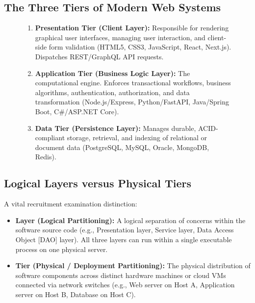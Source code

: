 \subsection{The Three Tiers of Modern Web Systems}
\begin{figure}[htbp]
\centering
\begin{tcolorbox}[colback=codebg, colframe=primary, title=\textbf{The Three-Tier Web Architecture Breakdown}]
\begin{enumerate}
    \item \textbf{Presentation Tier (Client Layer):} Responsible for rendering graphical user interfaces, managing user interaction, and client-side form validation (HTML5, CSS3, JavaScript, React, Next.js). Dispatches REST/GraphQL API requests.
    \item \textbf{Application Tier (Business Logic Layer):} The computational engine. Enforces transactional workflows, business algorithms, authentication, authorization, and data transformation (Node.js/Express, Python/FastAPI, Java/Spring Boot, C\#/ASP.NET Core).
    \item \textbf{Data Tier (Persistence Layer):} Manages durable, ACID-compliant storage, retrieval, and indexing of relational or document data (PostgreSQL, MySQL, Oracle, MongoDB, Redis).
\end{enumerate}
\end{tcolorbox}
\end{figure}

\subsection{Logical Layers versus Physical Tiers}
A vital recruitment examination distinction:
\begin{itemize}
    \item \textbf{Layer (Logical Partitioning):} A logical separation of concerns within the software source code (e.g., Presentation layer, Service layer, Data Access Object [DAO] layer). All three layers can run within a single executable process on one physical server.
    \item \textbf{Tier (Physical / Deployment Partitioning):} The physical distribution of software components across distinct hardware machines or cloud VMs connected via network switches (e.g., Web server on Host A, Application server on Host B, Database on Host C).
\end{itemize}

